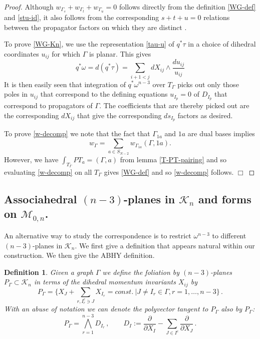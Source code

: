 \documentclass[11pt]{article}
\newcommand{\p}{\partial}
\newcommand{\cK}{\mathcal{K}}
\newcommand{\cM}{\mathcal{M}}
\newcommand{\1}{{\rm 1\hskip-0.25em I}}
\newtheorem{defn}{Definition}[section]
\begin{document}
\begin{proof}
Although $w_{\Gamma_s}+w_{\Gamma_t}+w_{\Gamma_u}=0$ follows directly from the  definition \eqref{WG-def} and \eqref{stu-id}, it also follows from the corresponding $s+t+u=0$ relations between the propagator factors on which they are distinct \cite{Arkani-Hamed:2017mur}.  

To prove \eqref{WG-Kn}, we use the representation \eqref{tau-u} of $q^*\tau$ in a choice of dihedral coordinates $u_{ij}$ for which $\Gamma$ is planar. This gives
\begin{equation}
q^*\omega=d(q^*\tau)=\sum_{i+1<j} d X_{ij}\wedge\frac{du_{ij}}{u_{ij}}
\end{equation}
 It is then easily seen that integration of $q^*\omega^{n-3}$  over $T_\Gamma$ picks out only those poles in $u_{ij}$ that correspond to the defining equations  $u_{I_p}=0$ of $D_{I_p}$  that correspond to propagators of $\Gamma$.  The coefficients that are thereby picked out are the corresponding $dX_{ij}$ that give the corresponding $ds_{I_p}$ factors as desired.

To prove \eqref{w-decomp} we note that the fact that $\Gamma_{1a}$ and $1a$ are dual bases implies 
\begin{equation}
w_\Gamma=\sum_{a\in S_{N-2}} w_{\Gamma_{1a}} (\Gamma,1a).  
\end{equation}
However, we have $\int_{T_\Gamma} PT_a=(\Gamma,a)$ from lemma \ref{T-PT-pairing} and so evaluating \eqref{w-decomp} on all $T_\Gamma$ gives \eqref{WG-def} and so \eqref{w-decomp} follows. $\Box$
\end{proof}

\subsection{Associahedral $(n-3)$-planes in $\cK_n$ and forms on $\cM_{0,n}$.}

An alternative way to study the correspondence is to restrict $\omega^{n-3}$ to different $(n-3)$-planes in $\cK_n$. We first give a definition that appears natural within our construction.  We then give the ABHY definition.

\begin{defn}
Given a graph $\Gamma$ we define the foliation by $(n-3)$-planes $P_\Gamma\subset \cK_n$  in terms of the dihedral  momentum invariants $X_{ij}$ by 
\begin{equation}
P_\Gamma=\{ X_J + \sum_{r, I_r^c\ni J} X_{I_r}=const.\ | J\neq  I_r\in \Gamma, r=1,\ldots , n-3\}\,. \label{P-def}
\end{equation}
With an abuse of notation we can denote the polyvector tangent to $P_\Gamma$ also by $P_\Gamma$:
\begin{equation}
P_\Gamma=\bigwedge_{r=1}^{n-3}D_{I_r} \, , \qquad D_{I}:=\frac{\p}{\p X_{I}}-\sum _{J\in I^c}\frac{\p}{\p X_{J}}\, .
\end{equation}
\end{defn}
\end{document}
